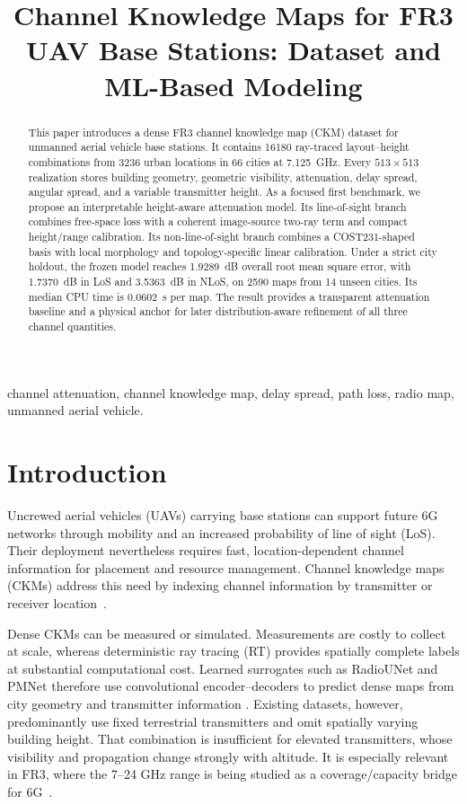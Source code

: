 \documentclass[10pt,conference,letterpaper]{IEEEtran}
\title{Channel Knowledge Maps for FR3 UAV Base Stations: Dataset and ML-Based Modeling}
\author{\IEEEauthorblockN{Guillem Moreno Garcia, Sergi Abadal, Evgenii Vinogradov}
\IEEEauthorblockA{Universitat Polit\`ecnica de Catalunya (UPC), Barcelona, Spain\\
guillem.moreno.garcia@estudiantat.upc.edu}}
\begin{document}
\maketitle

\begin{abstract}
This paper introduces a dense FR3 channel knowledge map (CKM) dataset for
unmanned aerial vehicle base stations. It contains 16180 ray-traced
layout--height combinations from 3236 urban locations in 66 cities at
\SI{7.125}{GHz}. Every $513\times513$ realization stores building geometry,
geometric visibility, attenuation, delay spread, angular spread, and a
variable transmitter height. As a focused first benchmark, we propose an
interpretable height-aware attenuation model. Its line-of-sight branch combines
free-space loss with a coherent image-source two-ray term and compact
height/range calibration. Its non-line-of-sight branch combines a
COST231-shaped basis with local morphology and topology-specific linear
calibration. Under a strict city holdout, the frozen model reaches
\SI{1.9289}{dB} overall root mean square error, with \SI{1.7370}{dB} in LoS and
\SI{3.5363}{dB} in NLoS, on 2590 maps from 14 unseen cities. Its median CPU
time is \SI{0.0602}{s} per map. The result provides a transparent attenuation
baseline and a physical anchor for later distribution-aware refinement of all
three channel quantities.
\end{abstract}

\begin{IEEEkeywords}
channel attenuation, channel knowledge map, delay spread, path loss, radio
map, unmanned aerial vehicle.
\end{IEEEkeywords}

\section{Introduction}
Uncrewed aerial vehicles (UAVs) carrying base stations can support future 6G
networks through mobility and an increased probability of line of sight (LoS).
Their deployment nevertheless requires fast, location-dependent channel
information for placement and resource management. Channel knowledge maps
(CKMs) address this need by indexing channel information by transmitter or
receiver location~\cite{ckmtutorial2024,zengx2021ckm}.

Dense CKMs can be measured or simulated. Measurements are costly to collect at
scale, whereas deterministic ray tracing (RT) provides spatially complete
labels at substantial computational cost. Learned surrogates such as
RadioUNet and PMNet therefore use convolutional encoder--decoders to predict
dense maps from city geometry and transmitter information
\cite{radiounet2020,pmnet2023}. Existing datasets, however, predominantly use
fixed terrestrial transmitters and omit spatially varying building height.
That combination is insufficient for elevated transmitters, whose visibility
and propagation change strongly with altitude. It is especially relevant in
FR3, where the 7--24 GHz range is being studied as a coverage/capacity bridge
for 6G~\cite{Cui2024}.
\end{document}
